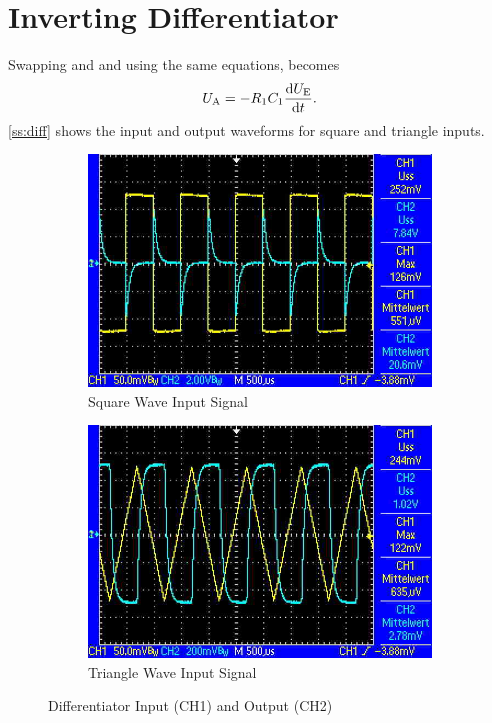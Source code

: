 \section{Inverting Differentiator}

Swapping  and  and using the same equations, \ua becomes \[U_\text{A} = - R_1 C_1 \frac{\mathop{}\!\mathrm{d} U_\text{E}}{\mathop{}\!\mathrm{d} t}.\]
\autoref{ss:diff} shows the input and output waveforms for square and triangle inputs.

\begin{figure}
	\centering
	\begin{subfigure}{0.4\textwidth}
		\centering
		\includegraphics[width=.9\linewidth]{./img/ss-diff-1.jpg}
		\caption{Square Wave Input Signal}
	\end{subfigure}
	\begin{subfigure}{0.4\textwidth}
		\centering
		\includegraphics[width=.9\linewidth]{./img/ss-diff-2.jpg}
		\caption{Triangle Wave Input Signal}
	\end{subfigure}
	\caption{Differentiator Input (CH1) and Output (CH2)}
	\label{ss:diff}
\end{figure}
